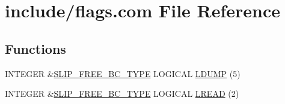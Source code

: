 \hypertarget{home_2abonfi_2_c_f_d__codes_2_eul_f_s_83_84_2include_2flags_8com}{\section{include/flags.com File Reference}
\label{home_2abonfi_2_c_f_d__codes_2_eul_f_s_83_84_2include_2flags_8com}
}
\subsection*{Functions}
\begin{DoxyCompactItemize}
\item 
I\-N\-T\-E\-G\-E\-R \&\hyperlink{home_2abonfi_2_c_f_d__codes_2_eul_f_s_83_84_2include_2flags_8com_a6beb6f16ff7301fc1f9a031b0f564045}{S\-L\-I\-P\-\_\-\-F\-R\-E\-E\-\_\-\-B\-C\-\_\-\-T\-Y\-P\-E} L\-O\-G\-I\-C\-A\-L \hyperlink{home_2abonfi_2_c_f_d__codes_2_eul_f_s_83_84_2include_2flags_8com_a56577bf0709747e4804db4d3bb3ca810}{L\-D\-U\-M\-P} (5)
\item 
I\-N\-T\-E\-G\-E\-R \&\hyperlink{home_2abonfi_2_c_f_d__codes_2_eul_f_s_83_84_2include_2flags_8com_a6beb6f16ff7301fc1f9a031b0f564045}{S\-L\-I\-P\-\_\-\-F\-R\-E\-E\-\_\-\-B\-C\-\_\-\-T\-Y\-P\-E} L\-O\-G\-I\-C\-A\-L \hyperlink{home_2abonfi_2_c_f_d__codes_2_eul_f_s_83_84_2include_2flags_8com_aea278b60e9a744704973b7b8aecd9442}{L\-R\-E\-A\-D} (2)
\end{DoxyCompactItemize}
